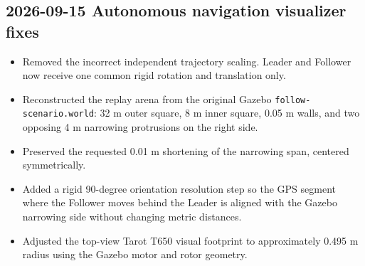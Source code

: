 \documentclass[a4paper]{article}
\title{}
\date{}
\author{Mohammad Rahmani}
\begin{document}
   \begin{preview}
      \section*{2026-09-15 Autonomous navigation visualizer fixes}

      \begin{itemize}
         \item Removed the incorrect independent trajectory scaling. Leader and Follower now receive one common rigid rotation and translation only.
         \item Reconstructed the replay arena from the original Gazebo \texttt{follow-scenario.world}: 32 m outer square, 8 m inner square, 0.05 m walls, and two opposing 4 m narrowing protrusions on the right side.
         \item Preserved the requested 0.01 m shortening of the narrowing span, centered symmetrically.
         \item Added a rigid 90-degree orientation resolution step so the GPS segment where the Follower moves behind the Leader is aligned with the Gazebo narrowing side without changing metric distances.
         \item Adjusted the top-view Tarot T650 visual footprint to approximately 0.495 m radius using the Gazebo motor and rotor geometry.
      \end{itemize}
   \end{preview}
\end{document}
